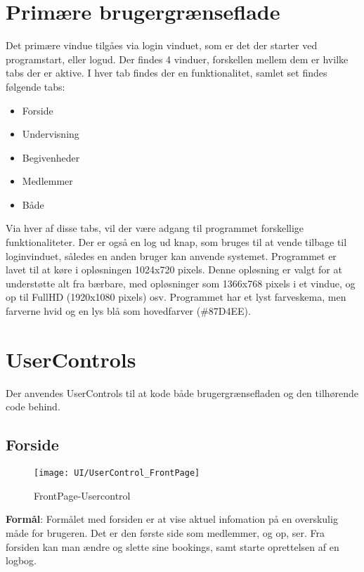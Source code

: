 \section{Primære brugergrænseflade}
Det primære vindue tilgåes via login vinduet, som er det der starter ved programstart, eller logud. 
Der findes 4 vinduer, forskellen mellem dem er hvilke tabs der er aktive. 
I hver tab findes der en funktionalitet, samlet set findes følgende tabs:
\begin{itemize}%
    \item Forside
    \item Undervisning
    \item Begivenheder
    \item Medlemmer
    \item Både
\end{itemize}

Via hver af disse tabs, vil der være adgang til programmet forskellige funktionaliteter.
Der er også en log ud knap, som bruges til at vende tilbage til loginvinduet, således en anden bruger kan anvende systemet.
Programmet er lavet til at køre i opløsningen 1024x720 pixels.
Denne opløsning er valgt for at understøtte alt fra bærbare, med opløsninger som 1366x768 pixels i et vindue, og op til FullHD (1920x1080 pixels) osv.
Programmet har et lyst farveskema, men farverne hvid og en lys blå som hovedfarver (\#87D4EE).

\section{UserControls}
Der anvendes UserControls til at kode både brugergrænsefladen og den tilhørende code behind.

\subsection{Forside}
\begin{figure}
    \label{img:frontpage}
    \vspace{-10pt}
    \begin{center}
        \texttt{[image: UI/UserControl\_FrontPage]}
    \end{center}
    \vspace{-15pt}
    \caption{FrontPage-Usercontrol}
\end{figure}

\textbf{Formål}: 
Formålet med forsiden er at vise aktuel infomation på en overskulig måde for brugeren.
Det er den første side som medlemmer, og op, ser.
Fra forsiden kan man ændre og slette sine bookings, samt starte oprettelsen af en logbog.

